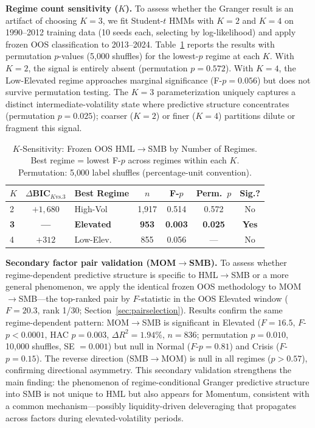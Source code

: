 \documentclass[sigconf,anonymous]{acmart}
\begin{document}
\textbf{Regime count sensitivity ($K$).}
To assess whether the Granger result is an artifact of choosing $K = 3$, we fit
Student-$t$ HMMs with $K = 2$ and $K = 4$ on 1990--2012 training data
(10 seeds each, selecting by log-likelihood) and apply frozen OOS classification
to 2013--2024. Table~\ref{tab:k_sensitivity} reports the results with permutation
$p$-values (5{,}000 shuffles) for the lowest-$p$ regime at each $K$.
With $K = 2$, the signal is entirely absent (permutation $p = 0.572$).
With $K = 4$, the Low-Elevated regime approaches marginal significance
(F-$p = 0.056$) but does not survive permutation testing.
The $K = 3$ parameterization uniquely captures a distinct intermediate-volatility state
where predictive structure concentrates (permutation $p = 0.025$);
coarser ($K = 2$) or finer ($K = 4$) partitions dilute or fragment this signal.

\begin{table}[t]
\centering
\caption{$K$-Sensitivity: Frozen OOS HML$\to$SMB by Number of Regimes.
Best regime = lowest F-$p$ across regimes within each $K$.
Permutation: 5{,}000 label shuffles (percentage-unit convention).}
\label{tab:k_sensitivity}
\scriptsize
\begin{tabular}{@{}lclcccc@{}}
\toprule
$K$ & $\Delta$BIC$_{K\text{vs.}3}$ & Best Regime & $n$ & F-$p$ & Perm.\ $p$ & Sig.? \\
\midrule
2 & $+1{,}680$ & High-Vol & 1{,}917 & 0.514 & 0.572 & No \\
\textbf{3} & \textbf{---} & \textbf{Elevated} & \textbf{953} & \textbf{0.003} & \textbf{0.025} & \textbf{Yes} \\
4 & $+312$ & Low-Elev. & 855 & 0.056 & --- & No \\
\bottomrule
\end{tabular}
\end{table}

\textbf{Secondary factor pair validation (MOM$\to$SMB).}
To assess whether regime-dependent predictive structure is specific to HML$\to$SMB or a
more general phenomenon, we apply the identical frozen OOS methodology to MOM$\to$SMB---the
top-ranked pair by $F$-statistic in the OOS Elevated window ($F = 20.3$, rank 1/30;
Section~\ref{sec:pairselection}).
Results confirm the same regime-dependent pattern:
MOM$\to$SMB is significant in Elevated ($F = 16.5$, $F$-$p < 0.0001$, HAC $p = 0.003$,
$\Delta R^2 = 1.94\%$, $n = 836$; permutation $p = 0.010$, 10{,}000 shuffles, SE $= 0.001$)
but null in Normal ($F$-$p = 0.81$) and Crisis ($F$-$p = 0.15$).
The reverse direction (SMB$\to$MOM) is null in all regimes ($p > 0.57$), confirming
directional asymmetry.
This secondary validation strengthens the main finding: the phenomenon of
regime-conditional Granger predictive structure into SMB is not unique to HML but also
appears for Momentum, consistent with a common mechanism---possibly liquidity-driven
deleveraging that propagates across factors during elevated-volatility periods.
\end{document}
